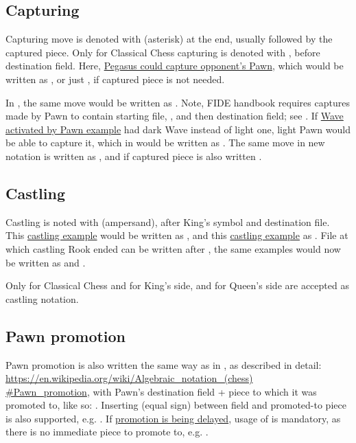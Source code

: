 \subsection*{Capturing}
\label{sec:Appendix/Notation/Capturing}

Capturing move is denoted with \alg{*} (asterisk) at the end, usually followed by the captured
piece. Only for Classical Chess capturing is denoted with , before destination field.
Here, \hyperref[fig:scn_ct_04_pegasus_movement]{Pegasus could capture opponent's Pawn}, which
would be written as , or just , if captured piece is not needed.

In , the same move would be written as . Note, FIDE handbook requires
captures made by Pawn to contain starting file, , and then destination field; see
.
If \hyperref[fig:scn_mv_16_wave_activation_by_capture_pawn]{Wave activated by Pawn example} had
dark Wave instead of light one, light Pawn would be able to capture it, which in 
would be written as . The same move in new notation is written as , and
if captured piece is also written .

\subsection*{Castling}
\label{sec:Appendix/Notation/Castling}

Castling is noted with \alg{\&} (ampersand), after King's symbol and destination file. This
\hyperref[fig:age_of_aquarius_castling_left_04]{castling example} would be written as ,
and this \hyperref[fig:one_castling_right_04]{castling example} as . File at which
castling Rook ended can be written after \alg{\&}, the same examples would now be written as
 and .

Only for Classical Chess  and  for King's side,  and
 for Queen's side are accepted as castling notation.

\subsection*{Pawn promotion}
\label{sec:Appendix/Notation/Pawn promotion}

Pawn promotion is also written the same way as in , as described in detail: \\
\href{https://en.wikipedia.org/wiki/Algebraic\_notation\_(chess)\#Pawn\_promotion}{https://en.wikipedia.org/wiki/Algebraic\_notation\_(chess)\\
\#Pawn\_promotion}, with Pawn's destination field + piece to which it was promoted to,
like so: . Inserting \alg{=} (equal sign) between field and promoted-to piece
is also supported, e.g. .
If \hyperref[fig:scn_aoa_05_delayed_promo_pawn_2_moved]{promotion is being delayed}, usage
of \alg{=} is mandatory, as there is no immediate piece to promote to, e.g. .

